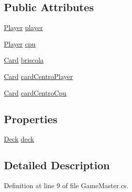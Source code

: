 \subsection*{Public Attributes}
\begin{DoxyCompactItemize}
\item 
\hyperlink{class_fontanella_1_1_simone_1_1__5i_1_1_briscola_1_1_player}{Player} \hyperlink{class_fontanella_1_1_simone_1_1__5i_1_1_briscola_1_1_game_master_ad26dcfbe972933f69347ff5219b9c668}{player}
\item 
\hyperlink{class_fontanella_1_1_simone_1_1__5i_1_1_briscola_1_1_player}{Player} \hyperlink{class_fontanella_1_1_simone_1_1__5i_1_1_briscola_1_1_game_master_ac4cb67561d9cec29ca3d046e85b22196}{cpu}
\item 
\hyperlink{class_fontanella_1_1_simone_1_1__5i_1_1_briscola_1_1_card}{Card} \hyperlink{class_fontanella_1_1_simone_1_1__5i_1_1_briscola_1_1_game_master_a292123e911a73c41132d10ca7fcaf8fa}{briscola}
\item 
\hyperlink{class_fontanella_1_1_simone_1_1__5i_1_1_briscola_1_1_card}{Card} \hyperlink{class_fontanella_1_1_simone_1_1__5i_1_1_briscola_1_1_game_master_a48a9a2dd41e58c313126540da5263c19}{card\+Centro\+Player}
\item 
\hyperlink{class_fontanella_1_1_simone_1_1__5i_1_1_briscola_1_1_card}{Card} \hyperlink{class_fontanella_1_1_simone_1_1__5i_1_1_briscola_1_1_game_master_aa8074fef382a50a86f59d20b431a8df8}{card\+Centro\+Cpu}
\end{DoxyCompactItemize}
\subsection*{Properties}
\begin{DoxyCompactItemize}
\item 
\hyperlink{class_fontanella_1_1_simone_1_1__5i_1_1_briscola_1_1_deck}{Deck} \hyperlink{class_fontanella_1_1_simone_1_1__5i_1_1_briscola_1_1_game_master_a20b2b972a62fd9a96cc40c1540732550}{deck}
\end{DoxyCompactItemize}


\subsection{Detailed Description}


Definition at line 9 of file Game\+Master.\+cs.



